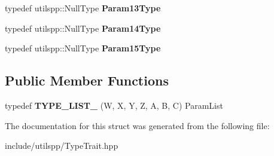 \begin{DoxyCompactItemize}
\item 
\hypertarget{structutilspp_1_1PointerOnFunction_3_01V_07_5_08_07W_00_01X_00_01Y_00_01Z_00_01A_00_01B_00_01C_08_4_a597775279f1eb87fd372efcaaa12eb26}{typedef utilspp\-::\-Null\-Type {\bfseries Param13\-Type}}\label{structutilspp_1_1PointerOnFunction_3_01V_07_5_08_07W_00_01X_00_01Y_00_01Z_00_01A_00_01B_00_01C_08_4_a597775279f1eb87fd372efcaaa12eb26}

\item 
\hypertarget{structutilspp_1_1PointerOnFunction_3_01V_07_5_08_07W_00_01X_00_01Y_00_01Z_00_01A_00_01B_00_01C_08_4_ac298a1bfdacef78a901c65c70dc60692}{typedef utilspp\-::\-Null\-Type {\bfseries Param14\-Type}}\label{structutilspp_1_1PointerOnFunction_3_01V_07_5_08_07W_00_01X_00_01Y_00_01Z_00_01A_00_01B_00_01C_08_4_ac298a1bfdacef78a901c65c70dc60692}

\item 
\hypertarget{structutilspp_1_1PointerOnFunction_3_01V_07_5_08_07W_00_01X_00_01Y_00_01Z_00_01A_00_01B_00_01C_08_4_ad26e67cafa700facdb08d6c3db00a951}{typedef utilspp\-::\-Null\-Type {\bfseries Param15\-Type}}\label{structutilspp_1_1PointerOnFunction_3_01V_07_5_08_07W_00_01X_00_01Y_00_01Z_00_01A_00_01B_00_01C_08_4_ad26e67cafa700facdb08d6c3db00a951}

\end{DoxyCompactItemize}
\subsection*{Public Member Functions}
\begin{DoxyCompactItemize}
\item 
\hypertarget{structutilspp_1_1PointerOnFunction_3_01V_07_5_08_07W_00_01X_00_01Y_00_01Z_00_01A_00_01B_00_01C_08_4_ad0f7a009bbd5e448b9c244f52f103dbb}{typedef {\bfseries T\-Y\-P\-E\-\_\-\-L\-I\-S\-T\-\_} (W, X, Y, Z, A, B, C) Param\-List}\label{structutilspp_1_1PointerOnFunction_3_01V_07_5_08_07W_00_01X_00_01Y_00_01Z_00_01A_00_01B_00_01C_08_4_ad0f7a009bbd5e448b9c244f52f103dbb}

\end{DoxyCompactItemize}


The documentation for this struct was generated from the following file\-:\begin{DoxyCompactItemize}
\item 
include/utilspp/Type\-Trait.\-hpp\end{DoxyCompactItemize}
